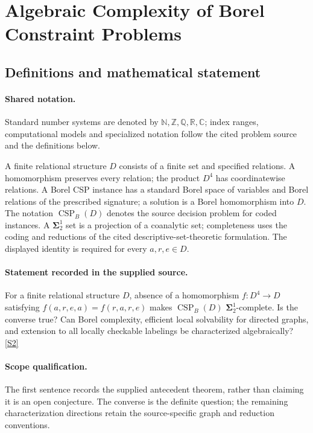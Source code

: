\documentclass[11pt]{article}
\newcommand{\sref}[2]{\hyperlink{source:#1:#2}{[S#2]}}
\begin{document}
\section{Algebraic Complexity of Borel Constraint Problems}\label{statement}

\subsection{Definitions and mathematical statement}

\paragraph{Shared notation.}Standard number systems are denoted by $\mathbb N,\mathbb Z,\mathbb Q,\mathbb R,\mathbb C$; index ranges, computational models and specialized notation follow the cited problem source and the definitions below.


A finite relational structure $D$ consists of a finite set and specified relations. A homomorphism preserves every relation; the product $D^4$ has coordinatewise relations. A Borel CSP instance has a standard Borel space of variables and Borel relations of the prescribed signature; a solution is a Borel homomorphism into $D$. The notation $\operatorname{CSP}_B(D)$ denotes the source decision problem for coded instances. A $\boldsymbol{\Sigma}^1_2$ set is a projection of a coanalytic set; completeness uses the coding and reductions of the cited descriptive-set-theoretic formulation. The displayed identity is required for every $a,r,e\in D$.
\paragraph{Statement recorded in the supplied source.}
For a finite relational structure $D$, absence of a homomorphism $f:D^4\to D$ satisfying $f(a,r,e,a)=f(r,a,r,e)$ makes $\operatorname{CSP}_B(D)$ $\boldsymbol{\Sigma}^1_2$-complete. Is the converse true? Can Borel complexity, efficient local solvability for directed graphs, and extension to all locally checkable labelings be characterized algebraically? \sref{statement}{2}
\paragraph{Scope qualification.}
The first sentence records the supplied antecedent theorem, rather than claiming it is an open conjecture. The converse is the definite question; the remaining characterization directions retain the source-specific graph and reduction conventions.
\end{document}
